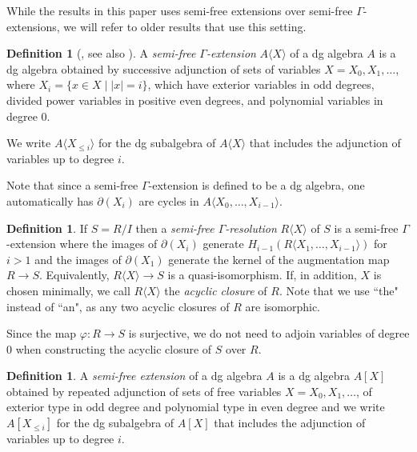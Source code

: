 \documentclass{amsart}
\theoremstyle{definition}
\newtheorem{defn}[theorem]{Definition}
\theoremstyle{remark}
\begin{document}
While the results in this paper uses semi-free extensions over semi-free $\Gamma$-extensions, we will refer to older results that use this setting.

\begin{defn}[\cite{tate1957homology}, see also \cite{AvramovIFR}]
\label{def-dga}
    A \emph{semi-free $\Gamma$-extension} $A\langle X\rangle$ of a dg algebra $A$ is a dg algebra obtained by successive adjunction of sets of variables $X=X_0,X_1, \ldots$, where $X_i=\{x \in X \mid |x|=i\}$,  which have exterior variables in odd degrees, divided power variables in positive even degrees, and polynomial variables in degree 0.

     We write $A\langle X_{\leq i} \rangle$ for the dg subalgebra of $A\langle X\rangle$ that includes the adjunction of variables up to degree $i$.


    \end{defn}

   
        Note that since a semi-free $\Gamma$-extension is defined to be a dg algebra, one automatically has $\partial(X_i)$ are cycles in $A\langle X_0, \ldots, X_{i-1}\rangle$. 

\begin{defn}



    If $S=R/I$ then a \textit{semi-free $\Gamma$-resolution} $R\langle X \rangle $ of $S$ is a semi-free $\Gamma$-extension where the images of $\partial(X_i)$ generate $H_{i-1}\left(R\langle X_1, \ldots, X_{i-1}\rangle \right)$ for  $i> 1$ and the images of $\partial(X_1)$ generate the kernel of the augmentation map $R \to S$. Equivalently, $R\langle X \rangle  \to S$ is a quasi-isomorphism. If, in addition, $X$ is chosen minimally, we call $R\langle X \rangle$ the \emph{acyclic closure} of $R$. Note that we use ``the" instead of ``an", as any two acyclic closures of $R$ are isomorphic. 
\end{defn}

Since the map $\varphi: R \to S$ is surjective, we do not need to adjoin variables of degree $0$ when constructing the acyclic closure of $S$ over $R$.


\begin{defn}
       A \textit{semi-free extension} of a dg algebra $A$ is a dg algebra $A[X]$ obtained by repeated adjunction of sets of free variables $X= X_0, X_1, \ldots$, of exterior type in odd degree and polynomial type in even degree and we write $A[ X_{\leq i} ]$ for the dg subalgebra of $A[ X]$ that includes the adjunction of variables up to degree $i$.
    
\end{defn}
\end{document}
